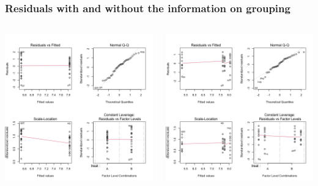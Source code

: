 \documentclass{beamer}
\begin{document}
\begin{frame}
    \frametitle{Residuals with and without the information on grouping}

    \begin{columns}
        \begin{column}{0.5\textwidth}
            \includegraphics[width=\textwidth]{lectures/day_2_LM_refresh_I/figures/unnamed-chunk-47-1.png}
            \scalebox{0.75}{
                
            }
        \end{column}
        \begin{column}{0.5\textwidth}
            \includegraphics[width=\textwidth]{lectures/day_2_LM_refresh_I/figures/unnamed-chunk-49-1.png}

\end{column}
\end{columns}
\end{frame}
\end{document}
